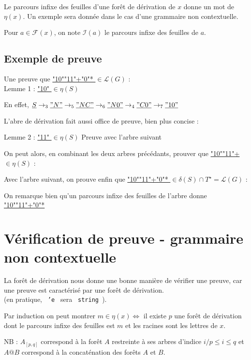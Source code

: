 \documentclass[a4paper,12pt]{article}
\begin{document}
Le parcours infixe des feuilles d'une forêt de dérivation de $x$ donne un mot de $\eta(x)$.
Un exemple sera donnée dans le cas d'une grammaire non contextuelle.

Pour $a \in \mathcal{F}(x)$, on note $\mathcal{I}(a)$ le parcours infixe des feuilles de $a$. 

\subsection{Exemple de preuve}

Une preuve que \underline{ "10""11"+"0"* } $\in \mathcal{L}(G)$ :\\
Lemme 1 : \underline{ "10" } $\in \eta(S)$

    En effet, $\underline{ S }\rightarrow_3 \underline{ "N" } \rightarrow_5 \underline{ "NC" } \rightarrow_6 \underline{ "N0" } \rightarrow_4 \underline{ "C0" } \rightarrow_7 \underline{ "10" }$


L'abre de dérivation fait aussi office de preuve, bien plus concise :

Lemme 2 : \underline{ "11" } $\in \eta(S)$
Preuve avec l'arbre suivant

On peut alors, en combinant les deux arbres précédants, prouver que \underline{ "10""11"+ } $\in \eta(S)$ :

Avec l'arbre suivant, on prouve enfin que \underline{ "10""11"+"0"* } $\in \delta(S) \cap T^\star = \mathcal{L}(G)$ :

On remarque bien qu'un parcours infixe des feuilles de l'arbre donne \underline{ "10""11"+"0"* }

\section{Vérification de preuve - grammaire non contextuelle}

La forêt de dérivation nous donne une bonne manière de vérifier une preuve, car une preuve est caractérisé par une forêt de dérivation.\\

(en pratique, \texttt{ 'e } sera \texttt{ string }).

Par induction on peut montrer $m \in \eta(x) \iff $ il existe $p$ une forêt de dérivation dont le parcours infixe des feuilles est $m$ et les racines sont les lettres de $x$.

{\color{gray} NB : $A_{[p,q]}$ correspond à la forêt $A$ restreinte à ses arbres d'indice $i / p\leq i \leq q$ et $A@B$ correspond à la concaténation des forêts $A$ et $B$. }\\
\end{document}
